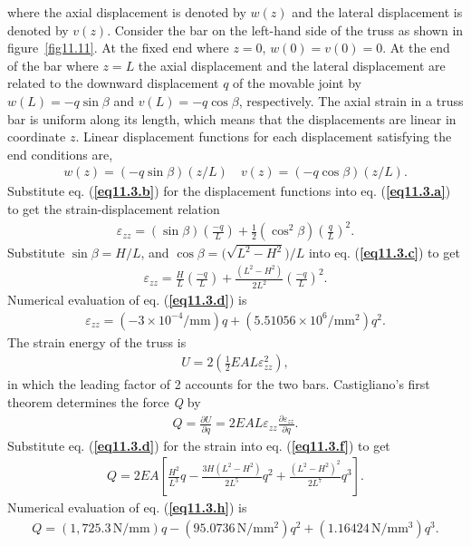 \documentclass{AeroStructure-ERJohnson}
\begin{document}
\begin{example}
\noindent where the axial displacement is denoted by $w(z)$ and the lateral displacement is denoted by $v(z)$. Consider the bar on the left-hand side of the truss as shown in figure~\ref{fig11.11}. At the fixed end where $z= 0$, $w(0)=v(0)=0$. At the end of the bar where $z=L$ the axial displacement and the lateral displacement are related to the downward displacement $q$ of the movable joint by $w(L)=-q \sin \beta$ and $v(L)=-q \cos \beta$, respectively. The axial strain in a truss bar is uniform along its length, which means that the displacements are linear in coordinate $z$. Linear displacement functions for each displacement satisfying the end conditions are,
\begin{align}
w(z)=(-q \sin \beta)(z/L) \quad v(z)=(-q \cos \beta)(z/L). \label{eq11.3.b}\tag{b}
\end{align}
Substitute eq. (\textbf{\ref{eq11.3.b}}) for the displacement functions into eq. (\textbf{\ref{eq11.3.a}}) to get the strain-displacement relation
\begin{align}
\varepsilon_{z z}=(\sin \beta)\left(\frac{-q}{L}\right)+\frac{1}{2}\left(\cos ^{2} \beta\right)\left(\frac{q}{L}\right)^{2}. \label{eq11.3.c}\tag{c}
\end{align}
Substitute $\sin \beta=H/L$, and $\cos \beta=\big(\sqrt{L^{2}-H^{2}}\big)/L$ into eq. (\textbf{\ref{eq11.3.c}}) to get
\begin{align}
\varepsilon_{z z}=\frac{H}{L}\left(\frac{-q}{L}\right)+\frac{\left(L^{2}-H^{2}\right)}{2 L^{2}}\left(\frac{-q}{L}\right)^{2}. \label{eq11.3.d}\tag{d}
\end{align}
Numerical evaluation of eq. (\textbf{\ref{eq11.3.d}}) is
\begin{align}
\varepsilon_{z z}=\left(-3 \times 10^{-4}/\mathrm{mm}\right) q+\left(5.51056 \times 10^{6}/\mathrm{mm}^{2}\right) q^{2}. \label{eq11.3.e}\tag{e}
\end{align}
The strain energy of the truss is\vspace*{-0.6pc}
\begin{align}
U=2\left(\frac{1}{2} E A L \varepsilon_{z z}^{2}\right), \label{eq11.3.f}\tag{f}
\end{align}
in which the leading factor of 2 accounts for the two bars. Castigliano's first theorem determines the force \textit{Q} by
\begin{align}
Q=\frac{\partial U}{\partial q}=2 E A L \varepsilon_{z z} \frac{\partial \varepsilon_{z z}}{\partial q}. \label{eq11.3.g}\tag{g}
\end{align}
Substitute eq. (\textbf{\ref{eq11.3.d}}) for the strain into eq. (\textbf{\ref{eq11.3.f}}) to get
\begin{align}
Q=2 E A\left[\frac{H^{2}}{L^{3}} q-\frac{3 H\left(L^{2}-H^{2}\right)}{2 L^{5}} q^{2}+\frac{\left(L^{2}-H^{2}\right)^{2}}{2 L^{7}} q^{3}\right]. \label{eq11.3.h}\tag{h}
\end{align}
Numerical evaluation of eq. (\textbf{\ref{eq11.3.h}}) is
\begin{align}
Q=(1{,}725.3\,\mathrm{N}/\mathrm{mm}) q-(95.0736\,\mathrm{N}/\mathrm{mm}^{2}) q^{2}+(1.16424\,\mathrm{N}/ \mathrm{mm}^{3}) q^{3}. \label{eq11.3.i}\tag{i}
\end{align}


\end{example}
\end{document}
